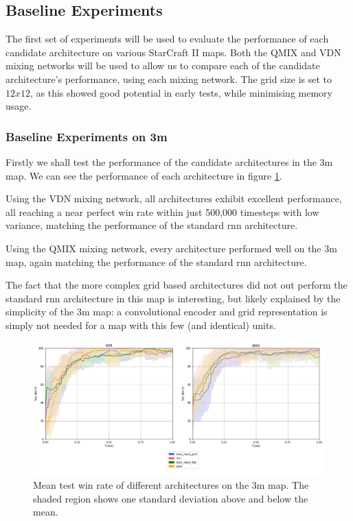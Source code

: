 \subsection{Baseline Experiments}

The first set of experiments will be used to evaluate the performance of each candidate architecture on various StarCraft II maps. Both the QMIX and VDN mixing networks will be used to allow us to compare each of the candidate architecture's performance, using each mixing network. The grid size is set to $12x12$, as this showed good potential in early tests, while minimising memory usage.


\subsubsection{Baseline Experiments on 3m}

Firstly we shall test the performance of the candidate architectures in the 3m map. We can see the performance of each architecture in figure \ref{fig:3m_all}. 

Using the VDN mixing network, all architectures exhibit excellent performance, all reaching a near perfect win rate within just 500,000 timesteps with low variance, matching the performance of the standard rnn architecture.

Using the QMIX mixing network, every architecture performed well on the 3m map, again matching the performance of the standard rnn architecture. 

The fact that the more complex grid based architectures did not out perform the standard rnn architecture in this map is interesting, but likely explained by the simplicity of the 3m map: a convolutional encoder and grid representation is simply not needed for a map with this few (and identical) units.

\begin{figure}[h]
    \centering
    \hbox{\hspace{-6.35em}\includegraphics[width=1.34\textwidth]{images/graphs/all3m.png}}
    \caption{Mean test win rate of different architectures on the 3m map. The shaded region shows one standard deviation above and below the mean.}
    \label{fig:3m_all}
\end{figure}

